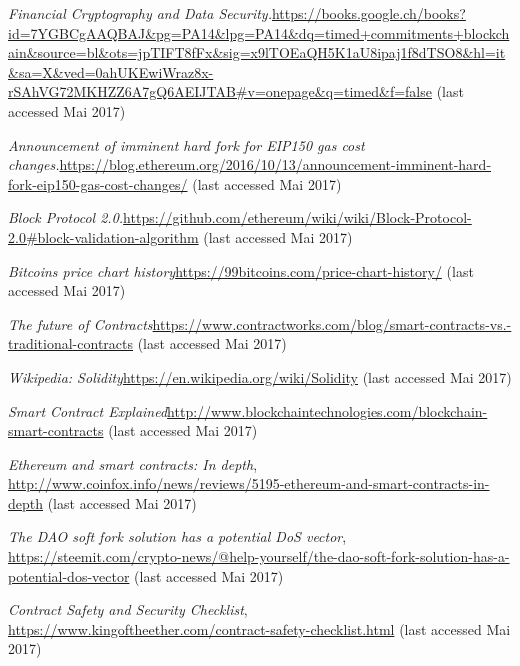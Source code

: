 \begin{thebibliography}{99}
\emph{Financial Cryptography and Data Security.}\url{https://books.google.ch/books?id=7YGBCgAAQBAJ&pg=PA14&lpg=PA14&dq=timed+commitments+blockchain&source=bl&ots=jpTIFT8fFx&sig=x9lTOEaQH5K1aU8ipaj1f8dTSO8&hl=it&sa=X&ved=0ahUKEwiWraz8x-rSAhVG72MKHZZ6A7gQ6AEIJTAB#v=onepage&q=timed&f=false} (last accessed Mai 2017)


\emph{Announcement of imminent hard fork for EIP150 gas cost changes.}\url{https://blog.ethereum.org/2016/10/13/announcement-imminent-hard-
fork-eip150-gas-cost-changes/} (last accessed Mai 2017)

\emph{Block Protocol 2.0.}\url{https://github.com/ethereum/wiki/wiki/Block-Protocol-2.0#block-validation-algorithm} (last accessed Mai 2017)

\emph{Bitcoins price chart history}\url{https://99bitcoins.com/price-chart-history/} (last accessed Mai 2017)

\emph{The future of Contracts}\url{https://www.contractworks.com/blog/smart-contracts-vs.-traditional-contracts} (last accessed Mai 2017)

\emph{Wikipedia: Solidity}\url{https://en.wikipedia.org/wiki/Solidity} (last accessed Mai 2017)

\emph{Smart Contract Explained}\url{http://www.blockchaintechnologies.com/blockchain-smart-contracts} (last accessed Mai 2017)

\emph{Ethereum and smart contracts: In depth}, \url{http://www.coinfox.info/news/reviews/5195-ethereum-and-smart-contracts-in-depth} (last accessed Mai 2017)

\emph{The DAO soft fork solution has a potential DoS vector}, \url{https://steemit.com/crypto-news/@help-yourself/the-dao-soft-fork-solution-has-a-potential-dos-vector} (last accessed Mai 2017)

\emph{Contract Safety and Security Checklist}, \url{https://www.kingoftheether.com/contract-safety-checklist.html} (last accessed Mai 2017)










\end{thebibliography}
